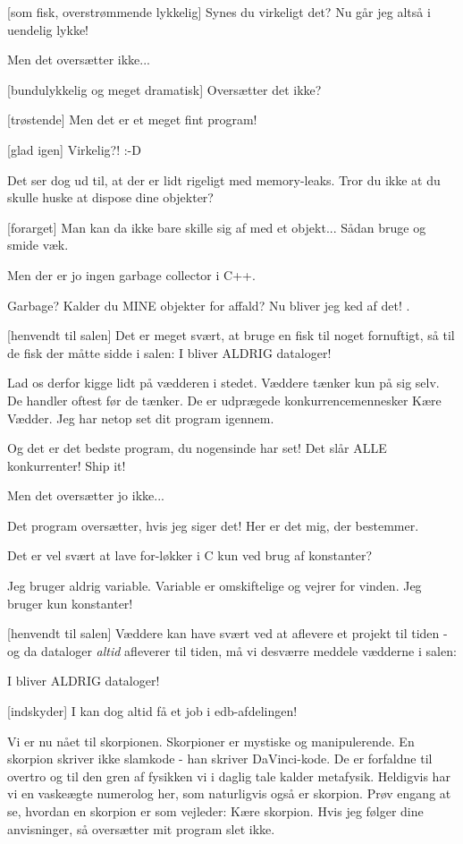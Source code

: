 \documentclass[a4paper,11pt]{article}
\begin{document}
\begin{sketch}
 [som fisk, overstrømmende lykkelig] Synes du virkeligt det? Nu går jeg altså i uendelig lykke!

 Men det oversætter ikke...

 [bundulykkelig og meget dramatisk] Oversætter det ikke?

 [trøstende] Men det er et meget fint program!

 [glad igen] Virkelig?! :-D

 Det ser dog ud til, at der er lidt rigeligt med memory-leaks. Tror du ikke at du skulle huske at dispose dine objekter?

 [forarget] Man kan da ikke bare skille sig af med et objekt... Sådan bruge og smide væk.

 Men der er jo ingen garbage collector i C++.

 Garbage? Kalder du MINE objekter for affald? Nu bliver jeg ked af det! .

 [henvendt til salen] Det er meget svært, at bruge en fisk til noget fornuftigt, så til de fisk der måtte sidde i salen: 
 I bliver ALDRIG dataloger!

 Lad os derfor kigge lidt på vædderen i stedet. Væddere tænker kun på sig selv. De handler oftest før de tænker. De er udprægede konkurrencemennesker  Kære Vædder. Jeg har netop set dit program igennem.

 Og det er det bedste program, du nogensinde har set! Det slår ALLE konkurrenter! Ship it!

 Men det oversætter jo ikke...

 Det program oversætter, hvis jeg siger det! Her er det mig, der bestemmer.

 Det er vel svært at lave for-løkker i C kun ved brug af konstanter?

 Jeg bruger aldrig variable. Variable er omskiftelige og vejrer for vinden. Jeg bruger kun konstanter!

 [henvendt til salen] Væddere kan have svært ved at aflevere et projekt til tiden - og da dataloger \textit{altid} afleverer til tiden, må vi desværre meddele vædderne i salen:

 I bliver ALDRIG dataloger!

 [indskyder] I kan dog altid få et job i edb-afdelingen!

 Vi er nu nået til skorpionen. Skorpioner er mystiske og manipulerende. En skorpion skriver ikke slamkode - han skriver DaVinci-kode. De er forfaldne til overtro og til den gren af fysikken vi i daglig tale kalder metafysik. Heldigvis har vi en vaskeægte numerolog her, som naturligvis også er skorpion. Prøv engang at se, hvordan en skorpion er som vejleder:  Kære skorpion. Hvis jeg følger dine anvisninger, så oversætter mit program slet ikke.


\end{sketch}
\end{document}
